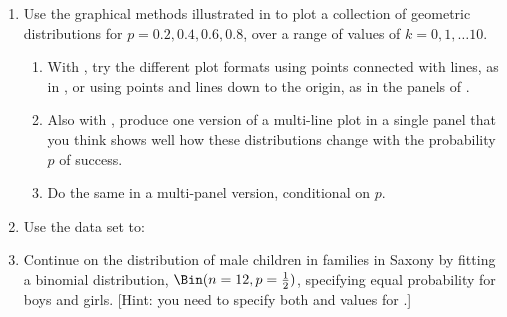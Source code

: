 \documentclass[11pt]{book}\usepackage[]{graphicx}\usepackage[]{color}
\begin{document}
\begin{enumerate}
  \item Use the graphical methods illustrated in 
  to plot a collection of geometric distributions for $p = 0.2, 0.4, 0.6, 0.8$,
  over a range of values of $k = 0, 1, \dots 10$.
  \begin{enumerate}
    \item With , try the different plot formats using points
    connected with lines, as in , or using points
    and lines down to the origin, as in the panels of .
    \item Also with , produce one version of a multi-line plot
    in a single panel that you think shows well how these distributions change
    with the probability $p$ of success.
    \item Do the same in a multi-panel version, conditional on $p$.
  \end{enumerate}
  
  \item Use the data set  to:
  
  \item Continue  on the distribution of male children in families
  in Saxony by fitting a binomial distribution, $\Bin(n=12, p=\frac12)$, specifying
  equal probability for boys and girls. [Hint:  you need to specify both  and
   values for .]


\end{enumerate}
\end{document}
